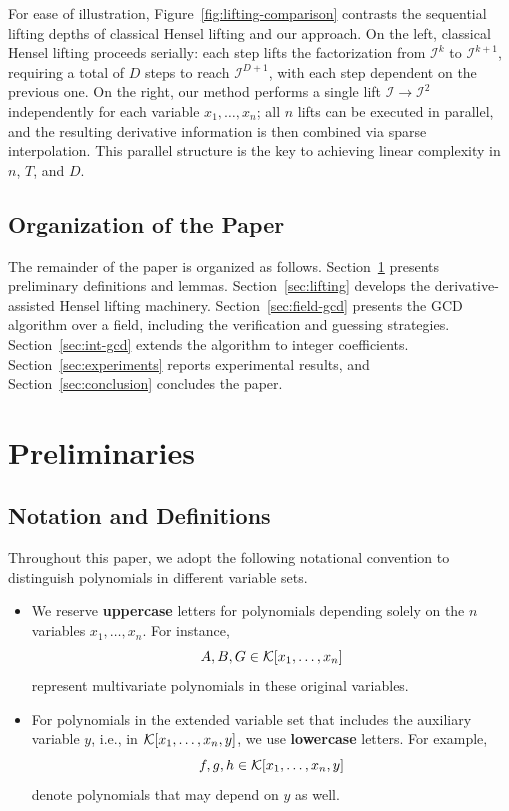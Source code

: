 \documentclass{article}
\numberwithin{equation}{section}
\begin{document}
For ease of illustration, Figure~\ref{fig:lifting-comparison} contrasts the sequential lifting depths of classical Hensel lifting and our approach. On the left, classical Hensel lifting proceeds serially: each step lifts the factorization from $\mathcal{I}^k$ to $\mathcal{I}^{k+1}$, requiring a total of $D$ steps to reach $\mathcal{I}^{D+1}$, with each step dependent on the previous one. On the right, our method performs a single lift $\mathcal{I} \to \mathcal{I}^2$ independently for each variable $x_1,\dots,x_n$; all $n$ lifts can be executed in parallel, and the resulting derivative information is then combined via sparse interpolation. This parallel structure is the key to achieving linear complexity in $n$, $T$, and $D$.

\subsection{Organization of the Paper}
\label{sec:roadmap}
The remainder of the paper is organized as follows. Section~\ref{sec:prelim} presents preliminary definitions and lemmas. Section~\ref{sec:lifting} develops the derivative-assisted Hensel lifting machinery. Section~\ref{sec:field-gcd} presents the GCD algorithm over a field, including the verification and guessing strategies. Section~\ref{sec:int-gcd} extends the algorithm to integer coefficients. Section~\ref{sec:experiments} reports experimental results, and Section~\ref{sec:conclusion} concludes the paper.






\section{Preliminaries}\label{sec:prelim}

\subsection{Notation and Definitions}

Throughout this paper, we adopt the following notational convention to distinguish polynomials in different variable sets.

\begin{itemize}
    \item 
    We reserve \textbf{uppercase} letters for polynomials depending solely on the   $n$ variables $x_1,\dots,x_n$. For instance,
\[
A, B, G \in {\mathcal{K}}[x_1,\dots,x_n]
\]
represent multivariate polynomials in these original variables.
    \item For polynomials in the extended variable set that includes the auxiliary variable $y$, i.e., in ${\mathcal{K}}[x_1,\dots,x_n,y]$, we use \textbf{lowercase} letters. For example,
    \[
    f, g, h \in {\mathcal{K}}[x_1,\dots,x_n,y]
    \]
    denote polynomials that may depend on $y$ as well.
\end{itemize}
\end{document}
